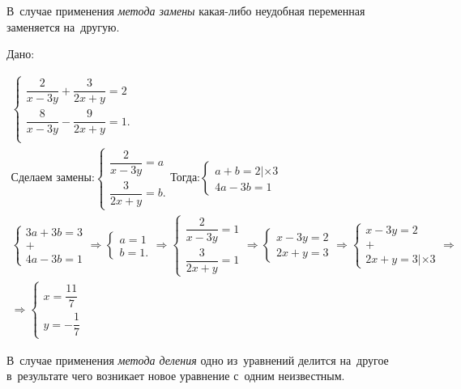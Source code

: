 \documentclass[]{scrartcl}
\begin{document}
В~случае применения \emph{метода замены} какая-либо неудобная переменная заменяется на~другую.

\begin{Thexmpl}\label{ex:sys3}
	Дано:
	
	${\displaystyle
	\begin{aligned}
	\begin{cases}
	\dfrac{2}{x-3y}+\dfrac{3}{2x+y}=2\\
	\dfrac{8}{x-3y}-\dfrac{9}{2x+y}=1.\\
	\end{cases}\\
	\text{Сделаем замены:}
	\begin{cases}
	\dfrac{2}{x-3y}=a\\
	\dfrac{3}{2x+y}=b.
	\end{cases}	
	\text{Тогда:}
	\begin{cases}
	a+b=2|\times3\\
	4a-3b=1
	\end{cases}\\
	\begin{cases}
	3a+3b=3\\
	+\\
	4a-3b=1
	\end{cases}
	\Rightarrow
	\begin{cases}
	a=1\\
	b=1.
	\end{cases}
	\Rightarrow
	\begin{cases}
	\dfrac{2}{x-3y}=1\\
	\dfrac{3}{2x+y}=1
	\end{cases}
	\Rightarrow
	\begin{cases}
	x-3y=2\\
	2x+y=3
	\end{cases}
	\Rightarrow
	\begin{cases}
	x-3y=2\\
	+\\
	2x+y=3|\times 3
	\end{cases}
	\Rightarrow\\
	\Rightarrow
	\begin{cases}
	x=\dfrac{11}{7}\\
	y=-\dfrac{1}{7}
	\end{cases}
	\end{aligned}}$
\end{Thexmpl}
В~случае применения \emph{метода деления} одно из~уравнений делится на~другое в~результате чего возникает новое уравнение с~одним неизвестным.
\end{document}
